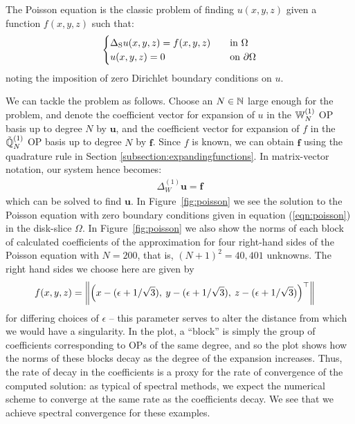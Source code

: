 \documentclass[11pt, oneside]{article}   	%
\begin{document}

The Poisson equation is the classic problem of finding $u(x,y,z)$ given a function $f(x,y,z)$ such that:
\begin{align}
	\begin{cases}
\Delta_{\rm S} u(x,y,z) = f(x,y,z) &\quad \text{in } \Omega \\
		u(x,y,z) = 0& \quad \text{on } \partial \Omega
	\end{cases}
	\label{eqn:poisson}
\end{align}
noting the imposition of zero Dirichlet boundary conditions on $u$.

We can tackle the problem as follows. Choose an $N \in \mathbb{N}$ large enough for the problem, and denote the coefficient vector for expansion of $u$ in the $\mathbb{W}_N^{(1)}$ OP basis up to degree $N$ by $\mathbf{u}$, and the coefficient vector for expansion of $f$ in the ${\mathbb{\tilde Q}}^{(1)}_{N}$ OP basis up to degree $N$ by $\mathbf{f}$. Since $f$ is known, we can obtain $\mathbf{f}$ using the quadrature rule in Section \ref{subsection:expandingfunctions}. In matrix-vector notation, our system hence becomes:
\begin{align*}
    \Delta_W^{(1)} \mathbf{u} = \mathbf{f}
\end{align*}
which can be solved to find $\mathbf{u}$.
In Figure~\ref{fig:poisson} we see the solution to the Poisson equation with zero boundary conditions given in equation (\ref{eqn:poisson}) in the disk-slice $\Omega$. In Figure~\ref{fig:poisson} we also show the norms of each block of calculated coefficients of the approximation for four right-hand sides of the Poisson equation with $N = 200$, that is, $(N+1)^2 = 40,401$ unknowns. The right hand sides we choose here are given by
\begin{align*}
	f(x,y,z) &= \left\| \Big(x - (\epsilon + 1 / \sqrt{3}), \: y - (\epsilon + 1 / \sqrt{3}), \: z - (\epsilon + 1 / \sqrt{3})\Big)^\top \right\|
\end{align*}
for differing choices of $\epsilon$ -- this parameter serves to alter the distance from which we would have a singularity. In the plot, a \enquote{block} is simply the group of coefficients corresponding to OPs of the same degree, and so the plot shows how the norms of these blocks decay as the degree of the expansion increases. Thus, the rate of decay in the coefficients is a proxy for the rate of convergence of the computed solution: as typical of spectral methods, we expect the numerical scheme to converge at the same rate as the coefficients decay. We see that we achieve spectral convergence for these examples.
\end{document}
